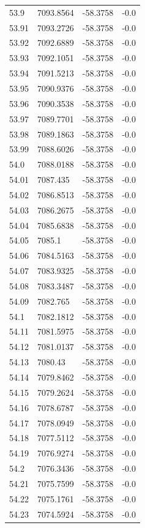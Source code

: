 \begin{table}[H]
\begin{tabular}{llll}
53.9 & 7093.8564 & -58.3758 & -0.0 \\
53.91 & 7093.2726 & -58.3758 & -0.0 \\
53.92 & 7092.6889 & -58.3758 & -0.0 \\
53.93 & 7092.1051 & -58.3758 & -0.0 \\
53.94 & 7091.5213 & -58.3758 & -0.0 \\
53.95 & 7090.9376 & -58.3758 & -0.0 \\
53.96 & 7090.3538 & -58.3758 & -0.0 \\
53.97 & 7089.7701 & -58.3758 & -0.0 \\
53.98 & 7089.1863 & -58.3758 & -0.0 \\
53.99 & 7088.6026 & -58.3758 & -0.0 \\
54.0 & 7088.0188 & -58.3758 & -0.0 \\
54.01 & 7087.435 & -58.3758 & -0.0 \\
54.02 & 7086.8513 & -58.3758 & -0.0 \\
54.03 & 7086.2675 & -58.3758 & -0.0 \\
54.04 & 7085.6838 & -58.3758 & -0.0 \\
54.05 & 7085.1 & -58.3758 & -0.0 \\
54.06 & 7084.5163 & -58.3758 & -0.0 \\
54.07 & 7083.9325 & -58.3758 & -0.0 \\
54.08 & 7083.3487 & -58.3758 & -0.0 \\
54.09 & 7082.765 & -58.3758 & -0.0 \\
54.1 & 7082.1812 & -58.3758 & -0.0 \\
54.11 & 7081.5975 & -58.3758 & -0.0 \\
54.12 & 7081.0137 & -58.3758 & -0.0 \\
54.13 & 7080.43 & -58.3758 & -0.0 \\
54.14 & 7079.8462 & -58.3758 & -0.0 \\
54.15 & 7079.2624 & -58.3758 & -0.0 \\
54.16 & 7078.6787 & -58.3758 & -0.0 \\
54.17 & 7078.0949 & -58.3758 & -0.0 \\
54.18 & 7077.5112 & -58.3758 & -0.0 \\
54.19 & 7076.9274 & -58.3758 & -0.0 \\
54.2 & 7076.3436 & -58.3758 & -0.0 \\
54.21 & 7075.7599 & -58.3758 & -0.0 \\
54.22 & 7075.1761 & -58.3758 & -0.0 \\
54.23 & 7074.5924 & -58.3758 & -0.0 \\

\end{tabular}
\end{table}
